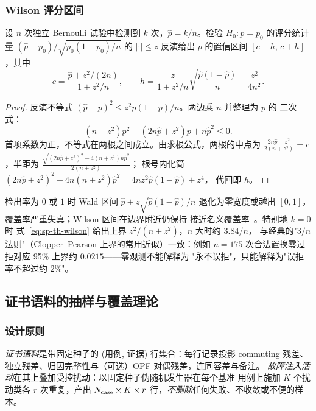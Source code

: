 \subsubsection{Wilson 评分区间}
\begin{proposition}[Wilson 区间]\label{prop:sp-th-wilson}
设 $n$ 次独立 Bernoulli 试验中检测到 $k$ 次，$\hat p=k/n$。检验
$H_0:p=p_0$ 的评分统计量 $(\hat p-p_0)/\sqrt{p_0(1-p_0)/n}$ 的
$|{\cdot}|\le z$ 反演给出 $p$ 的置信区间 $[c-h,\,c+h]$，其中
\begin{equation}
c=\frac{\hat p+z^2/(2n)}{1+z^2/n},\qquad
h=\frac{z}{1+z^2/n}
\sqrt{\frac{\hat p(1-\hat p)}{n}+\frac{z^2}{4n^2}}.
\label{eq:sp-th-wilson}
\end{equation}
\end{proposition}
\begin{proof}
反演不等式 $(\hat p-p)^2\le z^2 p(1-p)/n$。两边乘 $n$ 并整理为 $p$ 的
二次式：
\begin{equation}
(n+z^2)p^2-(2n\hat p+z^2)p+n\hat p^2\le0.
\end{equation}
首项系数为正，不等式在两根之间成立。由求根公式，两根的中点为
$\frac{2n\hat p+z^2}{2(n+z^2)}=c$，半距为
$\frac{\sqrt{(2n\hat p+z^2)^2-4(n+z^2)n\hat p^2}}{2(n+z^2)}$；
根号内化简
$(2n\hat p+z^2)^2-4n(n+z^2)\hat p^2
=4n z^2\hat p(1-\hat p)+z^4$，
代回即 $h$。
\end{proof}

\begin{remark}[为何不用正态近似区间]\label{rem:sp-th-why-wilson}
检出率为 $0$ 或 $1$ 时 Wald 区间 $\hat p\pm z\sqrt{\hat p(1-\hat p)/n}$
退化为零宽度或越出 $[0,1]$，覆盖率严重失真；Wilson 区间在边界附近仍保持
接近名义覆盖率~\cite{spth:wilson27}。特别地 $k=0$ 时
式~\eqref{eq:sp-th-wilson} 给出上界 $z^2/(n+z^2)$，$n$ 大时约 $3.84/n$，
与经典的"$3/n$ 法则"（Clopper--Pearson 上界的常用近似）一致：例如
$n=175$ 次合法置换零过拒对应 95\% 上界约 $0.0215$——零观测不能解释为
"永不误拒"，只能解释为"误拒率不超过约 $2\%$"。
\end{remark}

\subsection{证书语料的抽样与覆盖理论}\label{sec:sp-th-corpus}

\subsubsection{设计原则}
\begin{definition}[证书语料与故障注入活动]\label{def:sp-th-corpus}
\emph{证书语料}是带固定种子的 (用例, 证据) 行集合：每行记录投影 commuting
残差、独立残差、归因完整性与（可选）OPF 对偶残差，连同容差与备注。
\emph{故障注入活动}在其上叠加受控扰动：以固定种子伪随机发生器在每个基准
用例上施加 $K$ 个扰动类各 $r$ 次重复，产出 $N_{\rm case}\times K\times r$
行，\emph{不删除}任何失败、不收敛或不便的样本。
\end{definition}

